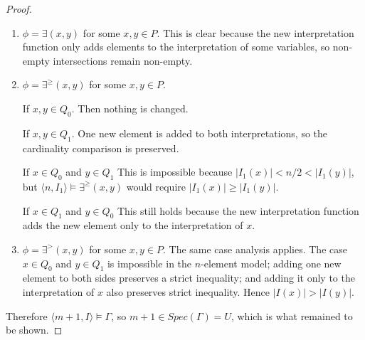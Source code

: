 \documentclass[10pt,a4paper]{amsart}
\begin{document}
\begin{proof}
\begin{enumerate}
		If $x \in Q_0$ and $y \in Q_1$. This is clear since the new function adds the only new elements to the interpretation of all variables in $Q_1$. 		 
		 
		 
		If $x \in Q_1$ and $y \in Q_0$. This is impossible since $\langle n, I_1\rangle \models \forall(x, y)$ we have $I_1(x) \subseteq I_1(y)$ and hence $|I_1(x)| \leq |I_1(y)|$, contradicting $|I_1(x)| > \frac{n}{2} > |I_1(y)|$.
		 
		 Thus, in all possible cases, we have $\langle m+1, I\rangle \models \phi$. 
		 \item $\phi = \exists(x, y)$ for some $x, y \in P$. This is clear because the new interpretation function only adds elements to the interpretation of some variables, so non-empty intersections remain non-empty. 
 		 \item $\phi = \exists^{\geq}(x, y)$ for some $x, y \in P$. 
		 
		  If $x, y \in Q_0$. Then nothing is changed. 
		  
		 If $x, y \in Q_1$. One new element is added to both interpretations, so the cardinality comparison is preserved. 
		 
		 If $x \in Q_0$ and $y \in Q_1$ This is impossible because $|I_1(x)|<n/2<|I_1(y)|$, but $\langle n,I_1\rangle\models\exists^{\geq}(x,y)$ would require $|I_1(x)|\geq|I_1(y)|$.

		 If $x \in Q_1$ and $y \in Q_0$ This still holds because the new interpretation function adds the new element only to the interpretation of $x$. 
  		 \item $\phi = \exists^{>}(x, y)$ for some $x, y \in P$. The same case analysis applies. The case $x\in Q_0$ and $y\in Q_1$ is impossible in the $n$-element model; adding one new element to both sides preserves a strict inequality; and adding it only to the interpretation of $x$ also preserves strict inequality. Hence $|I(x)|>|I(y)|$. 
 	\end{enumerate}

	Therefore $\langle m+1, I\rangle \models \Gamma$, so $m + 1 \in Spec(\Gamma) = U$, which is what remained to be shown.
\end{proof}
\end{document}
